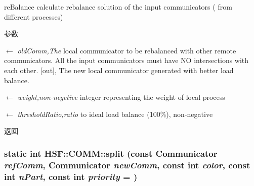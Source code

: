reBalance calculate rebalance solution of the input communicators ( from different processes) 
\begin{DoxyParams}{参数}
\item[\mbox{$\leftarrow$} {\em oldComm,The}]local communicator to be rebalanced with other remote communicators. All the input communicators must have NO intersections with each other. \mbox{[}out\mbox{]}, The new local communicator generated with better load balance. \item[\mbox{$\leftarrow$} {\em weight,non-\/negetive}]integer representing the weight of local process \item[\mbox{$\leftarrow$} {\em thresholdRatio,ratio}]to ideal load balance (100\%), non-\/negative \end{DoxyParams}
\begin{DoxyReturn}{返回}

\end{DoxyReturn}
\hypertarget{classHSF_1_1COMM_a1e80b3cf7e5fdf42c7e4461adfa116bc}{
\subsubsection[{split}]{\setlength{\rightskip}{0pt plus 5cm}static int HSF::COMM::split (const {\bf Communicator} {\em refComm}, \/  {\bf Communicator} {\em newComm}, \/  const int {\em color}, \/  const int {\em nPart}, \/  const int {\em priority} = {})}}
\label{classHSF_1_1COMM_a1e80b3cf7e5fdf42c7e4461adfa116bc}


